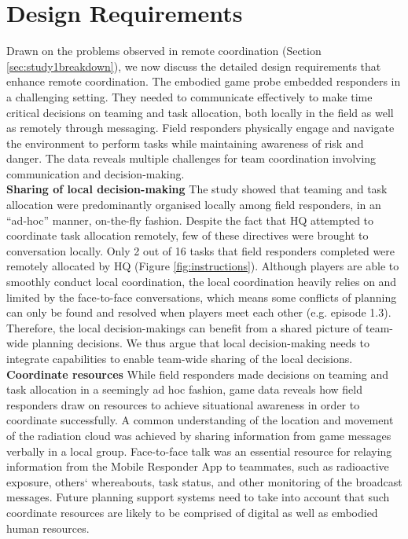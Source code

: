 

\section{Design Requirements}\label{sec:study1requirements}
Drawn on the problems observed in remote coordination (Section \ref{sec:study1breakdown}), we now discuss the detailed design requirements that enhance remote coordination. The embodied game probe embedded responders in a challenging setting. They needed to communicate effectively to make time critical decisions on teaming and task allocation, both locally in the field as well as remotely through messaging. Field responders physically engage and navigate the environment to perform tasks while maintaining awareness of risk and danger. The data reveals multiple challenges for team coordination involving communication and decision-making. \\

\textbf{Sharing of local decision-making} The study showed that teaming and task allocation were predominantly organised locally among field responders, in an ``ad-hoc'' manner, on-the-fly fashion. Despite the fact that HQ attempted to coordinate task allocation remotely, few of these directives were brought to conversation locally. Only 2 out of 16 tasks that field responders completed were remotely allocated by HQ (Figure \ref{fig:instructions}). Although players are able to smoothly conduct local coordination, the local coordination heavily relies on and limited by the face-to-face conversations, which means some conflicts of planning can only be found and resolved when players meet each other (e.g. episode 1.3). Therefore, the local decision-makings can benefit from a shared picture of team-wide planning decisions. We thus argue that local decision-making needs to integrate capabilities to enable team-wide sharing of the local decisions.\\

\textbf{Coordinate resources} While field responders made decisions on teaming and task allocation in a seemingly ad hoc fashion, game data reveals how field responders draw on resources to achieve situational awareness in order to coordinate successfully. A common understanding of the location and movement of the radiation cloud was achieved by sharing information from game messages verbally in a local group. Face-to-face talk was an essential resource for relaying information from the Mobile Responder App to teammates, such as radioactive exposure, others` whereabouts, task status, and other monitoring of the broadcast messages. Future planning support systems need to take into account that such coordinate resources are likely to be comprised of digital as well as embodied human resources. \\

